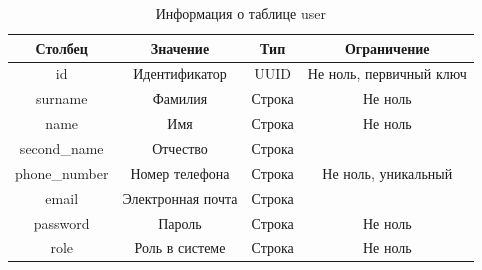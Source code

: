 \begin{table}[H]
    \begin{center}
        \caption{Информация о таблице user}
        \begin{tabular}{|c|c|c|c|}
            \hline
            \textbf{Столбец} & \textbf{Значение} & \textbf{Тип} & \textbf{Ограничение} \\
            \hline
            id & Идентификатор & UUID & Не ноль, первичный ключ \\
            \hline
            surname & Фамилия & Строка & Не ноль \\
            \hline
            name & Имя & Строка & Не ноль \\
            \hline
            second\_name & Отчество & Строка &  \\
            \hline
            phone\_number & Номер телефона & Строка & Не ноль, уникальный \\
            \hline
          	email & Электронная почта & Строка & \\
            \hline
            password & Пароль & Строка & Не ноль \\
            \hline
            role & Роль в системе & Строка & Не ноль \\
            \hline
        \end{tabular}
        \label{tbl:user}
    \end{center}
\end{table}

